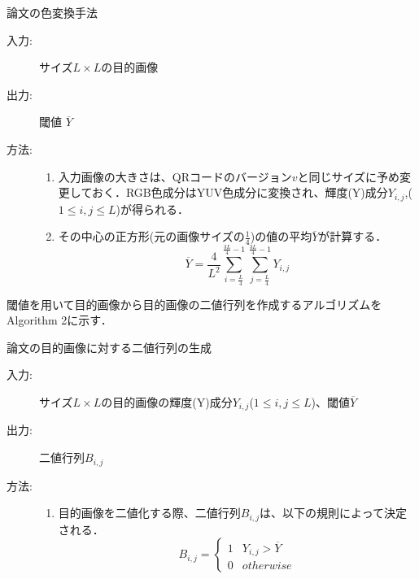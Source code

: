 \documentclass{thesis}
\begin{document}
\begin{algorithm}                      
\caption{論文\cite{KURI}の色変換手法}         
\label{alg:alg1} 
\begin{description}
\item[入力:] サイズ$L \times L$の目的画像
\item[出力:] 閾値 $\overline{Y}$
\item[方法:]
\begin{enumerate}
\item 入力画像の大きさは、QRコードのバージョン$v$と同じサイズに予め変更しておく．RGB色成分はYUV色成分に変換され、輝度(Y)成分$Y_{i,j}$,($1 \leq i,j \leq L$)が得られる．
\item その中心の正方形(元の画像サイズの$\frac{1}{4}$)の値の平均$\overline{Y}$が計算する．
\begin{equation}
\overline{Y} = \frac{4}{L^2} \sum_{i = \frac{L}{4}}^{\frac{3L}{4} - 1} \sum_{j = \frac{L}{4}}^{\frac{3L}{4} - 1} Y_{i,j}
\label{eq:pol4}
\end{equation}
\end{enumerate}
\end{description}
\end{algorithm}  

閾値を用いて目的画像から目的画像の二値行列を作成するアルゴリズムをAlgorithm 2に示す．

\begin{algorithm}                      
\caption{論文\cite{KURI}の目的画像に対する二値行列の生成}         
\label{alg:alg2} 
\begin{description}
\item[入力:] サイズ$L \times L$の目的画像の輝度(Y)成分$Y_{i,j}$($1 \leq i,j \leq L$)、閾値$\overline{Y}$
\item[出力:] 二値行列$B_{i,j}$
\item[方法:]
\begin{enumerate}
\item 目的画像を二値化する際、二値行列$B_{i,j}$は、以下の規則によって決定される．
\begin{equation}
{B_{i,j} =}
\begin{cases}
1 & Y_{i,j} > \overline{Y} \\
0 & otherwise 
\end{cases}
\label{eq:binary}
\end{equation}
\end{enumerate}
\end{description}
\end{algorithm} 
\end{document}
